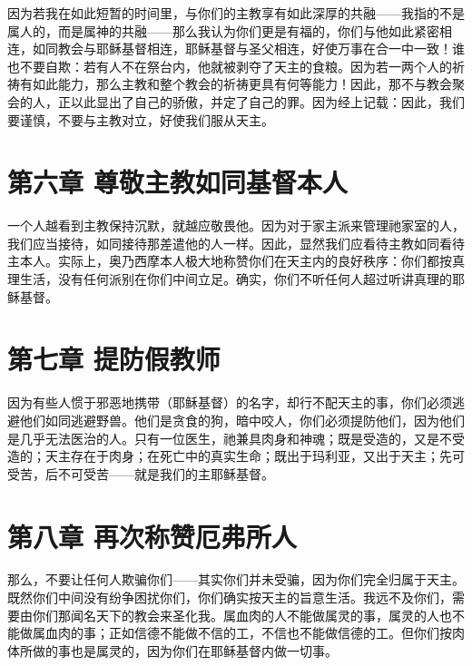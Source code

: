 因为若我在如此短暂的时间里，与你们的主教享有如此深厚的共融——我指的不是属人的，而是属神的共融——那么我认为你们更是有福的，你们与他如此紧密相连，如同教会与耶稣基督相连，耶稣基督与圣父相连，好使万事在合一中一致！谁也不要自欺：若有人不在祭台内，他就被剥夺了天主的食粮。因为若一两个人的祈祷有如此能力，那么主教和整个教会的祈祷更具有何等能力！因此，那不与教会聚会的人，正以此显出了自己的骄傲，并定了自己的罪。因为经上记载：因此，我们要谨慎，不要与主教对立，好使我们服从天主。\par


\section{第六章 尊敬主教如同基督本人}

一个人越看到主教保持沉默，就越应敬畏他。因为对于家主派来管理祂家室的人，我们应当接待，如同接待那差遣他的人一样。因此，显然我们应看待主教如同看待主本人。实际上，奥乃西摩本人极大地称赞你们在天主内的良好秩序：你们都按真理生活，没有任何派别在你们中间立足。确实，你们不听任何人超过听讲真理的耶稣基督。\par


\section{第七章 提防假教师}

因为有些人惯于邪恶地携带（耶稣基督）的名字，却行不配天主的事，你们必须逃避他们如同逃避野兽。他们是贪食的狗，暗中咬人，你们必须提防他们，因为他们是几乎无法医治的人。只有一位医生，祂兼具肉身和神魂；既是受造的，又是不受造的；天主存在于肉身；在死亡中的真实生命；既出于玛利亚，又出于天主；先可受苦，后不可受苦——就是我们的主耶稣基督。\par


\section{第八章 再次称赞厄弗所人}

那么，不要让任何人欺骗你们——其实你们并未受骗，因为你们完全归属于天主。既然你们中间没有纷争困扰你们，你们确实按天主的旨意生活。我远不及你们，需要由你们那闻名天下的教会来圣化我。属血肉的人不能做属灵的事，属灵的人也不能做属血肉的事；正如信德不能做不信的工，不信也不能做信德的工。但你们按肉体所做的事也是属灵的，因为你们在耶稣基督内做一切事。\par

